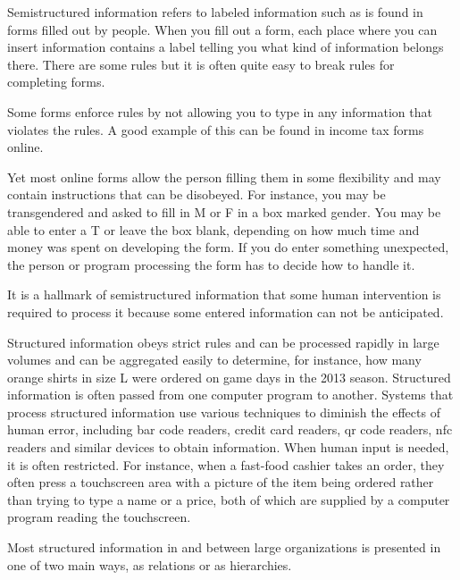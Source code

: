 \hypertarget{semistructured-information}{%
\label{semistructured-information}}

Semistructured information refers to labeled information such as is
found in forms filled out by people. When you fill out a form, each
place where you can insert information contains a label telling you what
kind of information belongs there. There are some rules but it is often
quite easy to break rules for completing forms.

Some forms enforce rules by not allowing you to type in any information
that violates the rules. A good example of this can be found in income
tax forms online.

Yet most online forms allow the person filling them in some flexibility
and may contain instructions that can be disobeyed. For instance, you
may be transgendered and asked to fill in M or F in a box marked gender.
You may be able to enter a T or leave the box blank, depending on how
much time and money was spent on developing the form. If you do enter
something unexpected, the person or program processing the form has to
decide how to handle it.

It is a hallmark of semistructured information that some human
intervention is required to process it because some entered information
can not be anticipated.

\hypertarget{structured-information}{%
\label{structured-information}}

Structured information obeys strict rules and can be processed rapidly
in large volumes and can be aggregated easily to determine, for
instance, how many orange shirts in size L were ordered on game days in
the 2013 season. Structured information is often passed from one
computer program to another. Systems that process structured information
use various techniques to diminish the effects of human error, including
bar code readers, credit card readers, qr code readers, nfc readers and
similar devices to obtain information. When human input is needed, it is
often restricted. For instance, when a fast-food cashier takes an order,
they often press a touchscreen area with a picture of the item being
ordered rather than trying to type a name or a price, both of which are
supplied by a computer program reading the touchscreen.

Most structured information in and between large organizations is
presented in one of two main ways, as relations or as hierarchies.

